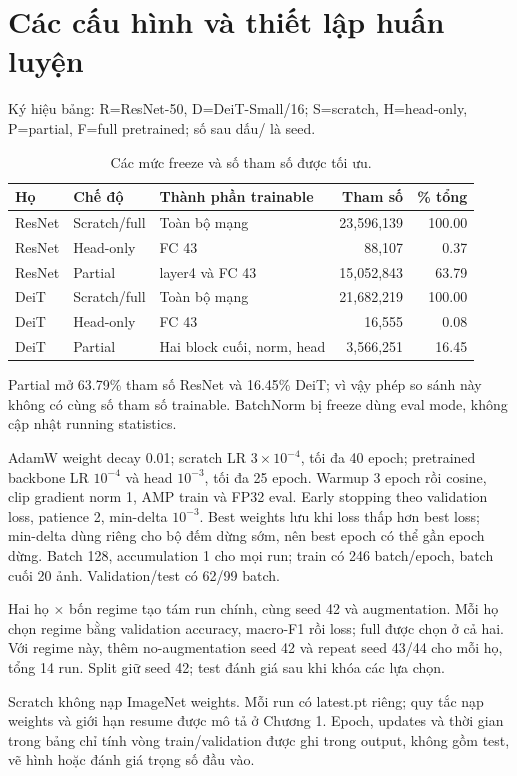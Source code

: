 \section{Các cấu hình và thiết lập huấn luyện}
Ký hiệu bảng: R=ResNet-50, D=DeiT-Small/16; S=scratch, H=head-only,
P=partial, F=full pretrained; số sau dấu/ là seed.
\begin{table}[H]\centering\caption{Các mức freeze và số tham số được tối ưu.}
\small\begin{tabularx}{\linewidth}{llXrr}\toprule
Họ & Chế độ & Thành phần trainable & Tham số & \% tổng\\\midrule
ResNet & Scratch/full & Toàn bộ mạng &23,596,139&100.00\\
ResNet & Head-only & FC 43 &88,107&0.37\\
ResNet & Partial & layer4 và FC 43 &15,052,843&63.79\\
DeiT & Scratch/full & Toàn bộ mạng &21,682,219&100.00\\
DeiT & Head-only & FC 43 &16,555&0.08\\
DeiT & Partial & Hai block cuối, norm, head &3,566,251&16.45\\\bottomrule
\end{tabularx}\label{table:a1-4}
\end{table}
Partial mở 63.79\% tham số ResNet và 16.45\% DeiT; vì vậy phép so sánh này
không có cùng số tham số trainable. BatchNorm bị freeze dùng eval
mode, không cập nhật running statistics.

AdamW weight decay 0.01; scratch LR $3\times10^{-4}$, tối đa 40 epoch;
pretrained backbone LR $10^{-4}$ và head $10^{-3}$, tối đa 25 epoch.
Warmup 3 epoch rồi cosine, clip gradient norm 1, AMP train và FP32 eval.
Early stopping theo validation loss, patience 2, min-delta $10^{-3}$.
Best weights lưu khi loss thấp hơn best loss; min-delta dùng riêng cho
bộ đếm dừng sớm, nên best epoch có thể gần epoch dừng.
Batch 128, accumulation 1 cho mọi run; train có 246 batch/epoch, batch
cuối 20 ảnh. Validation/test có 62/99 batch.

Hai họ $\times$ bốn regime tạo tám run chính, cùng seed 42 và augmentation.
Mỗi họ chọn regime bằng validation accuracy, macro-F1 rồi loss; full được
chọn ở cả hai. Với regime này, thêm no-augmentation seed 42 và repeat
seed 43/44 cho mỗi họ, tổng 14 run. Split giữ seed 42; test đánh giá sau
khi khóa các lựa chọn.

Scratch không nạp ImageNet weights. Mỗi run có latest.pt riêng; quy tắc
nạp weights và giới hạn resume được mô tả ở Chương 1.
Epoch, updates và thời gian trong bảng chỉ tính vòng train/validation
được ghi trong output, không gồm test, vẽ hình hoặc đánh giá trọng số đầu vào.

